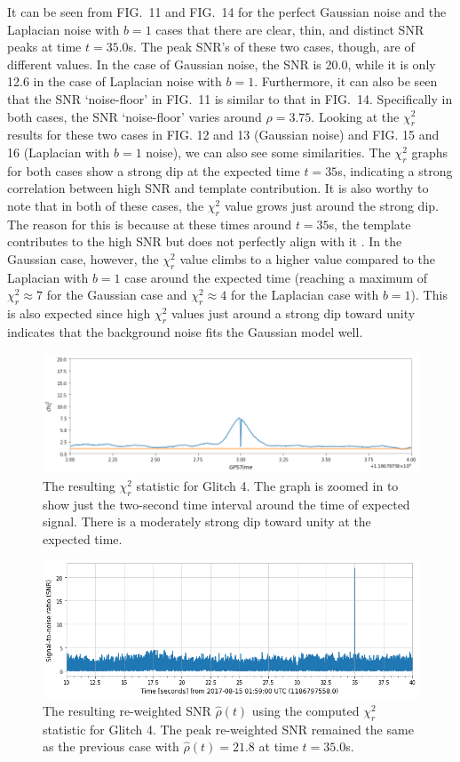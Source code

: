 \documentclass[preprint,
letterpaper,
 amsmath,amssymb,
 aps,
]{revtex4-2}
\begin{document}
It can be seen from FIG.\ 11 and FIG.\ 14 for the perfect Gaussian noise and the Laplacian noise with $b=1$ cases that there are clear, thin, and distinct SNR peaks at time $t = 35.0$s. The peak SNR's of these two cases, though, are of different values. In the case of Gaussian noise, the SNR is 20.0, while it is only 12.6 in the case of Laplacian noise with $b=1$. Furthermore, it can also be seen that the SNR `noise-floor' in FIG.\ 11 is similar to that in FIG.\ 14. Specifically in both cases, the SNR `noise-floor' varies around $\rho = 3.75$. Looking at the $\chi^2_r$ results for these two cases in FIG. 12 and 13 (Gaussian noise) and FIG. 15 and 16 (Laplacian with $b=1$ noise), we can also see some similarities. The $\chi^2_r$ graphs for both cases show a strong dip at the expected time $t=35$s, indicating a strong correlation between high SNR and template contribution. It is also worthy to note that in both of these cases, the $\chi^2_r$ value grows just around the strong dip. The reason for this is because at these times around $t=35$s, the template contributes to the high SNR but does not perfectly align with it \cite{collaboration2019open}. In the Gaussian case, however, the $\chi_r^2$ value climbs to a higher value compared to the Laplacian with $b=1$ case around the expected time (reaching a maximum of $\chi_r^2 \approx 7$ for the Gaussian case and $\chi_r^2\approx 4$ for the Laplacian case with $b=1$). This is also expected since high $\chi_r^2$ values just around a strong dip toward unity indicates that the background noise fits the Gaussian model well.

\begin{figure}
\includegraphics[width = .9\textwidth]{chi2 glitch 4.png}
\caption{The resulting $\chi^2_r$ statistic for Glitch 4. The graph is zoomed in to show just the two-second time interval around the time of expected signal. There is a moderately strong dip toward unity at the expected time.}
\centering
\end{figure} 

\begin{figure}[t]
\includegraphics[width = .9\textwidth]{reweighted glitch 4.png}
\caption{The resulting re-weighted SNR $\hat{\rho}(t)$ using the computed $\chi^2_r$ statistic for Glitch 4. The peak re-weighted SNR remained the same as the previous case with $\hat{\rho}(t)=21.8$ at time $t=35.0$s.}
\centering
\end{figure}
\end{document}
